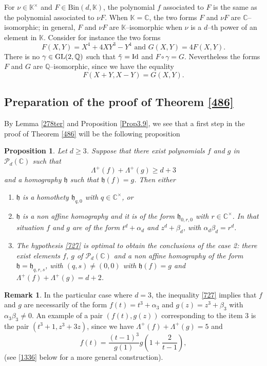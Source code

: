 \documentclass[10pt]{article}
\newtheorem{proposition}[theorem]{Proposition}
\theoremstyle{definition}
\newtheorem{remark}[theorem]{Remark}
\numberwithin{equation}{section}
\newcommand {\Q}{{\mathbb{Q}}}
\newcommand {\C}{{\mathbb{C}}}
\newcommand {\K}{{\mathbb{K}}}
\newcommand{\Bin}{\mathrm {Bin}}
\begin{document}
 
For $\nu\in \K^\times$ and $F\in\Bin(d,\K)$, the polynomial $f$ associated to  $F$  is the same as the polynomial associated to $\nu F$. When $\K=\C$, the two forms $F$ and $\nu F$ are $\C$--isomorphic;  in general, $F$ and $\nu F$ are $\K$--isomorphic when $\nu$ is a $d$--th power of an element in $\K$. 
 Consider for instance the two forms 	
\[
F(X,Y)=X^4+4XY^3-Y^4
\text{ and } G(X,Y)=4F(X,Y).
\]
There is no $\gamma \in  {\rm GL}(2, \Q)$ such that $\tilde \gamma ={\rm Id}$ and $F\circ \gamma =G$. Nevertheless the forms $F$ and $G$ are $\Q$--isomorphic, since we have the equality
  $$F(X+Y, X-Y) = G(X,Y).$$
 
 
\subsection{Preparation of the proof of Theorem \ref{486}} 

By Lemma \ref{278ter} and Proposition \ref{Prop3.9}, we see that a first step in the proof of Theorem \ref{486} will be the following proposition
 
\begin{proposition} \label{central724} Let $d\geqslant 3$. Suppose that there exist 
polynomials $f$ and $g$ in $ {\mathcal P}_d(\C)$ such that
\begin{equation}\label{727}
\Lambda^+ (f) +\Lambda^+ (g) \geqslant d+ 3
\end{equation}
 and a
 homography $\mathfrak h$ such that $\mathfrak h (f) = g$. Then either 
\begin{enumerate}
\item $\mathfrak h$ is a homothety $\mathfrak h_{q,0}$ with $q\in \C^\times$,
or
\item $\mathfrak h$ is a non affine homography and it is of the form $\mathfrak h_{0, r, 0}$ with $r\in \C^\times$. In that situation $f$ and $g$
are of the form $t^d + \alpha_d $ and $z^d+ \beta_d$, with $\alpha_d \beta_d = r^d$.
\item 
The hypothesis \eqref{727} is optimal to obtain the conclusions of the case 2: there exist elements $f$, $g$ of $ {\mathcal P}_d(\C)$ and a non affine homography of the form $\mathfrak h=\mathfrak h_{q,r,s}$, with $(q,s)\not=(0,0)$ with $\mathfrak h (f) = g$ and $\Lambda^+ (f) +\Lambda^+ (g) =d+2$.
\end{enumerate}
\end{proposition} 

\begin{remark} \label{remark:d=3}
In the particular case where $d=3$, the inequality \eqref{727} 
implies that $f$ and $g$ are necessarily of the form $f(t)= t^3+\alpha_3$ and $g(z) = z^3+\beta_3$ with $\alpha_3\beta_3\not=0$. An example of a pair $(f(t), g(z))$ corresponding to the item 3 is the pair
$(t^3+1, z^3+3z)$, since we have $\Lambda^+ (f) + \Lambda^+ (g) =5$ and 
\[
f(t) = \frac{(t-1)^3}{g(1)}g\left( 1+\frac 2{t-1} \right),
\]
(see \eqref{1336} below for a more general construction). \end{remark}
\end{document}
